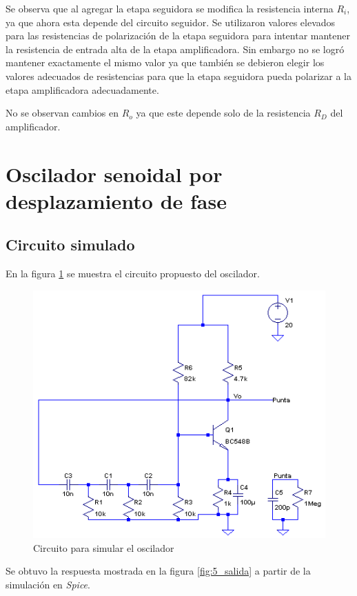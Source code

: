 \documentclass[10pt,spanish,a4paper,notitlepage]{article}
\begin{document}
Se observa que al agregar la etapa seguidora se modifica la resistencia interna
$R_i$, ya que ahora esta depende del circuito seguidor. Se utilizaron
valores elevados para las resistencias de polarización de la etapa seguidora
para intentar mantener la resistencia de entrada alta de la etapa amplificadora.
Sin embargo no se logró mantener exactamente el mismo valor ya que también
se debieron elegir los valores adecuados de resistencias para que la etapa
seguidora pueda polarizar a la etapa amplificadora adecuadamente.

No se observan cambios en $R_o$ ya que este depende solo de la resistencia
$R_D$ del amplificador.

\section{Oscilador senoidal por desplazamiento de fase}

\subsection{Circuito simulado}

En la figura \ref{fig:5_oscilador} se muestra el circuito propuesto 
del oscilador.

\begin{figure}[H]
\centering
\includegraphics[scale=0.75]{circuitos/5_oscilador.png}
\caption{Circuito para simular el oscilador}
\label{fig:5_oscilador}
\end{figure}

Se obtuvo la respuesta mostrada en la figura \ref{fig:5_salida} a partir de la simulación en \emph{Spice}.
\end{document}
